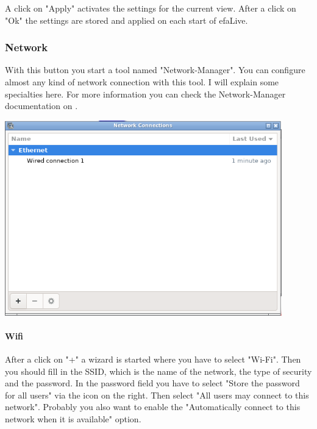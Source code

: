 \documentclass[a4paper,12pt,twoside]{article}
\begin{document}
A click on "Apply" activates the settings
for the current view. After a click on "Ok"
the settings are stored and applied on each start of efaLive.


\subsubsection{Network}
\label{sct:network}
With this button you start a tool named
"Network-Manager". You can configure almost
any kind of network connection with this tool. I will explain some
specialties here. For more information you can check the
Network-Manager documentation on \cite{NWM1}.

\bigskip
\begin{minipage}{\linewidth}
    \centering
    \captionsetup{type=figure}
    \includegraphics[width=12cm]{screenshots/network_manager.png}
    \label{fig:dialog_network}
\end{minipage}


\paragraph{Wifi}
\label{sct:wifi}
After a click on "+" a wizard is started where you have to select
"Wi-Fi". Then you should
fill in the SSID, which is the name of the network, the type of
security and the password. In the password field you have to select
"Store the password for all users" via the icon on the right. Then 
select "All users may connect to this network". Probably you also 
want to enable the "Automatically connect to this network when it 
is available" option.
\end{document}

